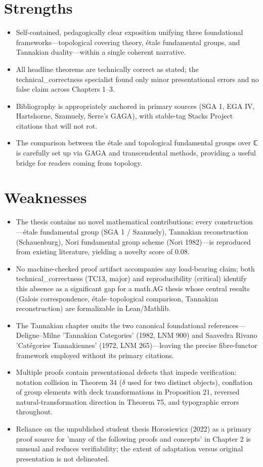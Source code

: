 \documentclass[11pt]{article}
\begin{document}
\section*{Strengths}
\begin{itemize}[leftmargin=*]
  \item Self-contained, pedagogically clear exposition unifying three foundational frameworks---topological covering theory, étale fundamental groups, and Tannakian duality---within a single coherent narrative.
  \item All headline theorems are technically correct as stated; the technical\_correctness specialist found only minor presentational errors and no false claim across Chapters 1--3.
  \item Bibliography is appropriately anchored in primary sources (SGA 1, EGA IV, Hartshorne, Szamuely, Serre's GAGA), with stable-tag Stacks Project citations that will not rot.
  \item The comparison between the étale and topological fundamental groups over ℂ is carefully set up via GAGA and transcendental methods, providing a useful bridge for readers coming from topology.
\end{itemize}

\section*{Weaknesses}
\begin{itemize}[leftmargin=*]
  \item The thesis contains no novel mathematical contributions: every construction---étale fundamental group (SGA 1 / Szamuely), Tannakian reconstruction (Schauenburg), Nori fundamental group scheme (Nori 1982)---is reproduced from existing literature, yielding a novelty score of 0.08.
  \item No machine-checked proof artifact accompanies any load-bearing claim; both technical\_correctness (TC13, major) and reproducibility (critical) identify this absence as a significant gap for a math.AG thesis whose central results (Galois correspondence, étale--topological comparison, Tannakian reconstruction) are formalizable in Lean/Mathlib.
  \item The Tannakian chapter omits the two canonical foundational references---Deligne--Milne 'Tannakian Categories' (1982, LNM 900) and Saavedra Rivano 'Catégories Tannakiennes' (1972, LNM 265)---leaving the precise fibre-functor framework employed without its primary citations.
  \item Multiple proofs contain presentational defects that impede verification: notation collision in Theorem 34 (\ensuremath{\delta} used for two distinct objects), conflation of group elements with deck transformations in Proposition 21, reversed natural-transformation direction in Theorem 75, and typographic errors throughout.
  \item Reliance on the unpublished student thesis Horosiewicz (2022) as a primary proof source for 'many of the following proofs and concepts' in Chapter 2 is unusual and reduces verifiability; the extent of adaptation versus original presentation is not delineated.
\end{itemize}
\end{document}
